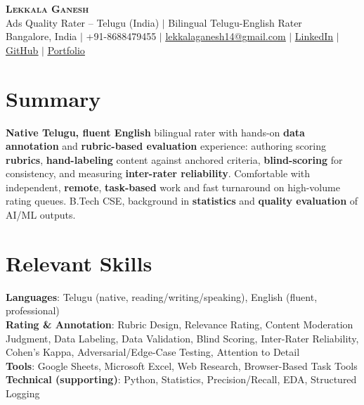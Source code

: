 \documentclass[letterpaper,10pt]{article}
\begin{document}
\begin{center}
    \textbf{\Huge \scshape Lekkala Ganesh} \\ \vspace{2pt}
    \small Ads Quality Rater -- Telugu (India) $|$ Bilingual Telugu-English Rater \\ \vspace{2pt}
    \small Bangalore, India $|$ +91-8688479455 $|$
    \href{mailto:lekkalaganesh14@gmail.com}{\underline{lekkalaganesh14@gmail.com}} $|$
    \href{https://linkedin.com/in/lekkala-ganesh}{\underline{LinkedIn}} $|$
    \href{https://github.com/LEKKALAGANESH}{\underline{GitHub}} $|$
    \href{https://lekkalaganesh.vercel.app}{\underline{Portfolio}}
\end{center}

\vspace{-8pt}
\section{Summary}
 \begin{itemize}[leftmargin=0.15in, label={}]
    \small{\item{
     \textbf{Native Telugu, fluent English} bilingual rater with hands-on \textbf{data
     annotation} and \textbf{rubric-based evaluation} experience: authoring scoring
     \textbf{rubrics}, \textbf{hand-labeling} content against anchored criteria,
     \textbf{blind-scoring} for consistency, and measuring \textbf{inter-rater reliability}.
     Comfortable with independent, \textbf{remote}, \textbf{task-based} work and fast
     turnaround on high-volume rating queues. B.Tech CSE, background in \textbf{statistics}
     and \textbf{quality evaluation} of AI/ML outputs.
    }}
 \end{itemize}

\section{Relevant Skills}
 \begin{itemize}[leftmargin=0.15in, label={}]
    \small{\item{
     \textbf{Languages}{: Telugu (native, reading/writing/speaking), English (fluent, professional)} \\
     \textbf{Rating \& Annotation}{: Rubric Design, Relevance Rating, Content Moderation Judgment,
       Data Labeling, Data Validation, Blind Scoring, Inter-Rater Reliability, Cohen's Kappa,
       Adversarial/Edge-Case Testing, Attention to Detail} \\
     \textbf{Tools}{: Google Sheets, Microsoft Excel, Web Research, Browser-Based Task Tools} \\
     \textbf{Technical (supporting)}{: Python, Statistics, Precision/Recall, EDA, Structured Logging}
    }}
 \end{itemize}
\end{document}
